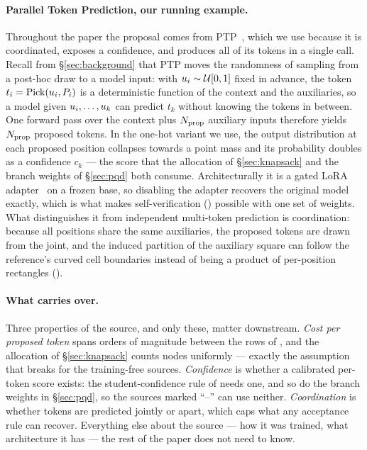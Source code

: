 \documentclass{article} %
\makeatletter
\newenvironment{ai}
  {\color{lightgray}%
   \@ifpackageloaded{caption}{\captionsetup{font={color=lightgray}}}{}%
   \let\ai@savedfloatreset\@floatboxreset
   \g@addto@macro\@floatboxreset{\color{lightgray}}}
  {\global\let\@floatboxreset\ai@savedfloatreset}
\makeatother
\begin{document}
\begin{ai}
\paragraph{Parallel Token Prediction, our running example.}
Throughout the paper the proposal comes from PTP~\citep{draxler2025ptp}, which we
use because it is coordinated, exposes a confidence, and produces all of its
tokens in a single call. Recall from \S\ref{sec:background} that PTP moves the
randomness of sampling from a post-hoc draw to a model input: with
$u_i \sim \mathcal{U}[0,1]$ fixed in advance, the token
$t_i = \operatorname{Pick}(u_i, P_i)$ is a deterministic function of the context and the
auxiliaries, so a model given $u_i, \dots, u_k$ can predict $t_k$ without
knowing the tokens in between. One forward pass over the context plus $N_{\mathrm{prop}}$
auxiliary inputs therefore yields $N_{\mathrm{prop}}$ proposed tokens. In the one-hot
variant we use, the output distribution at each proposed position collapses
towards a point mass and its probability doubles as a confidence $c_k$ --- the
score that the allocation of \S\ref{sec:knapsack} and the branch weights of
\S\ref{sec:pqd} both consume. Architecturally it is a gated LoRA
adapter~\citep{hu2022lora} on a frozen base, so disabling the adapter recovers
the original model exactly, which is what makes self-verification
() possible with one set of weights. What distinguishes it
from independent multi-token prediction is coordination: because all positions
share the same auxiliaries, the proposed tokens are drawn from the joint, and the
induced partition of the auxiliary square can follow the reference's curved cell
boundaries instead of being a product of per-position rectangles
().

\paragraph{What carries over.}
Three properties of the source, and only these, matter downstream. \emph{Cost per
proposed token} spans orders of magnitude between the rows of ,
and the allocation of \S\ref{sec:knapsack} counts nodes uniformly --- exactly the
assumption that breaks for the training-free sources. \emph{Confidence} is
whether a calibrated per-token score exists: the student-confidence rule of
 needs one, and so do the branch weights in
\S\ref{sec:pqd}, so the sources marked ``--'' can use neither.
\emph{Coordination} is whether tokens are predicted jointly or apart, which caps
what any acceptance rule can recover. Everything else about the source --- how it
was trained, what architecture it has --- the rest of the paper does not need to
know.


\end{ai}
\end{document}

